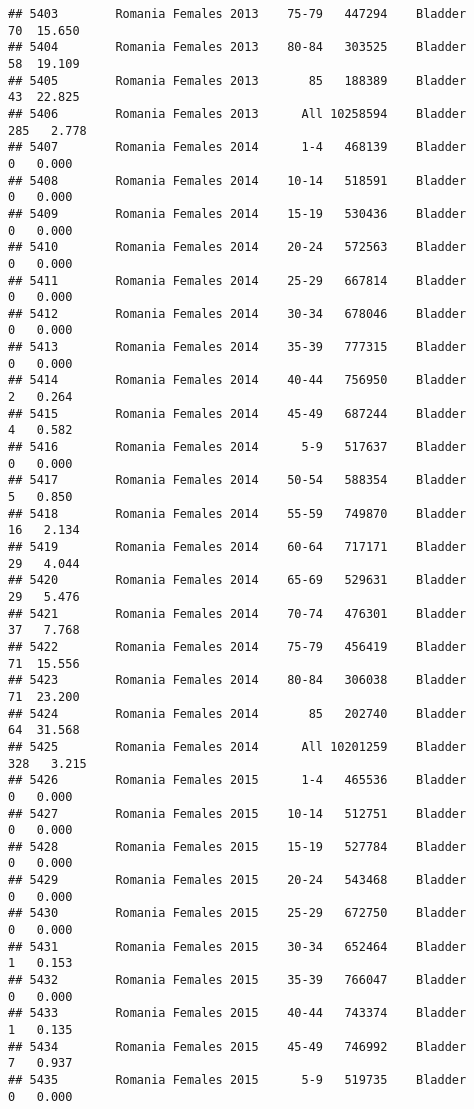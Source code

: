 \documentclass[
]{article}
\begin{document}
\begin{verbatim}
## 5403        Romania Females 2013    75-79   447294    Bladder     70  15.650
## 5404        Romania Females 2013    80-84   303525    Bladder     58  19.109
## 5405        Romania Females 2013       85   188389    Bladder     43  22.825
## 5406        Romania Females 2013      All 10258594    Bladder    285   2.778
## 5407        Romania Females 2014      1-4   468139    Bladder      0   0.000
## 5408        Romania Females 2014    10-14   518591    Bladder      0   0.000
## 5409        Romania Females 2014    15-19   530436    Bladder      0   0.000
## 5410        Romania Females 2014    20-24   572563    Bladder      0   0.000
## 5411        Romania Females 2014    25-29   667814    Bladder      0   0.000
## 5412        Romania Females 2014    30-34   678046    Bladder      0   0.000
## 5413        Romania Females 2014    35-39   777315    Bladder      0   0.000
## 5414        Romania Females 2014    40-44   756950    Bladder      2   0.264
## 5415        Romania Females 2014    45-49   687244    Bladder      4   0.582
## 5416        Romania Females 2014      5-9   517637    Bladder      0   0.000
## 5417        Romania Females 2014    50-54   588354    Bladder      5   0.850
## 5418        Romania Females 2014    55-59   749870    Bladder     16   2.134
## 5419        Romania Females 2014    60-64   717171    Bladder     29   4.044
## 5420        Romania Females 2014    65-69   529631    Bladder     29   5.476
## 5421        Romania Females 2014    70-74   476301    Bladder     37   7.768
## 5422        Romania Females 2014    75-79   456419    Bladder     71  15.556
## 5423        Romania Females 2014    80-84   306038    Bladder     71  23.200
## 5424        Romania Females 2014       85   202740    Bladder     64  31.568
## 5425        Romania Females 2014      All 10201259    Bladder    328   3.215
## 5426        Romania Females 2015      1-4   465536    Bladder      0   0.000
## 5427        Romania Females 2015    10-14   512751    Bladder      0   0.000
## 5428        Romania Females 2015    15-19   527784    Bladder      0   0.000
## 5429        Romania Females 2015    20-24   543468    Bladder      0   0.000
## 5430        Romania Females 2015    25-29   672750    Bladder      0   0.000
## 5431        Romania Females 2015    30-34   652464    Bladder      1   0.153
## 5432        Romania Females 2015    35-39   766047    Bladder      0   0.000
## 5433        Romania Females 2015    40-44   743374    Bladder      1   0.135
## 5434        Romania Females 2015    45-49   746992    Bladder      7   0.937
## 5435        Romania Females 2015      5-9   519735    Bladder      0   0.000

\end{verbatim}
\end{document}
